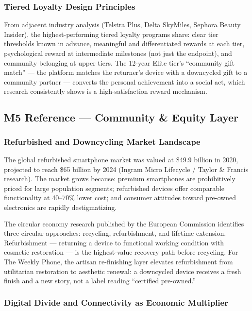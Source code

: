 \documentclass[11pt,letterpaper]{article}
\begin{document}
\subsubsection{Tiered Loyalty Design Principles}

From adjacent industry analysis (Telstra Plus, Delta SkyMiles, Sephora Beauty Insider), the highest-performing tiered loyalty programs share: clear tier thresholds known in advance, meaningful and differentiated rewards at each tier, psychological reward at intermediate milestones (not just the endpoint), and community belonging at upper tiers. The 12-year Elite tier's ``community gift match'' --- the platform matches the returner's device with a downcycled gift to a community partner --- converts the personal achievement into a social act, which research consistently shows is a high-satisfaction reward mechanism.

\subsection{M5 Reference --- Community \& Equity Layer}

\subsubsection{Refurbished and Downcycling Market Landscape}

The global refurbished smartphone market was valued at \$49.9 billion in 2020, projected to reach \$65 billion by 2024 (Ingram Micro Lifecycle / Taylor \& Francis research). The market grows because: premium smartphones are prohibitively priced for large population segments; refurbished devices offer comparable functionality at 40--70\% lower cost; and consumer attitudes toward pre-owned electronics are rapidly destigmatizing.

The circular economy research published by the European Commission identifies three circular approaches: recycling, refurbishment, and lifetime extension. Refurbishment --- returning a device to functional working condition with cosmetic restoration --- is the highest-value recovery path before recycling. For The Weekly Phone, the artisan re-finishing layer elevates refurbishment from utilitarian restoration to aesthetic renewal: a downcycled device receives a fresh finish and a new story, not a label reading ``certified pre-owned.''

\subsubsection{Digital Divide and Connectivity as Economic Multiplier}
\end{document}
